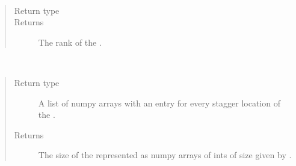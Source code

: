 \documentclass[letterpaper,10pt,english]{sphinxmanual}
\begin{document}
\begin{fulllineitems}

\begin{fulllineitems}
\label{\detokenize{grid:ESMF.api.grid.Grid.rank}}~\begin{quote}\begin{description}
\item[{Return type}] \leavevmode
{}

\item[{Returns}] \leavevmode
The rank of the {\hyperref[\detokenize{grid:ESMF.api.grid.Grid}]{}}.

\end{description}\end{quote}

\end{fulllineitems}


\begin{fulllineitems}
\label{\detokenize{grid:ESMF.api.grid.Grid.size}}~\begin{quote}\begin{description}
\item[{Return type}] \leavevmode
A list of numpy arrays with an entry for every stagger location
of the {\hyperref[\detokenize{grid:ESMF.api.grid.Grid}]{}}.

\item[{Returns}] \leavevmode
The size of the {\hyperref[\detokenize{grid:ESMF.api.grid.Grid}]{}} represented as
numpy arrays of ints of size given by
.

\end{description}\end{quote}

\end{fulllineitems}



\end{fulllineitems}
\end{document}
